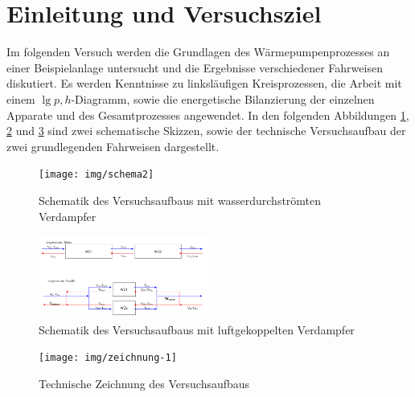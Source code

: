 \section{Einleitung und Versuchsziel}
\label{sec:aufgabenstellung}

Im folgenden Versuch werden die Grundlagen des Wärmepumpenprozesses an einer Beispielanlage untersucht und die Ergebnisse verschiedener Fahrweisen diskutiert. Es werden Kenntnisse zu linksläufigen Kreisprozessen, die Arbeit mit einem $\lg{p}, h$-Diagramm, sowie die energetische Bilanzierung der einzelnen Apparate und des Gesamtprozesses angewendet.
In den folgenden Abbildungen \ref{fig:schema1}, \ref{fig:schema2} und \ref{fig:tech_zeichnung} sind zwei schematische Skizzen, sowie der technische Versuchsaufbau der zwei grundlegenden Fahrweisen dargestellt.

\begin{figure}[h!]
	\centering
	\texttt{[image: img/schema2]}
	\caption{Schematik des Versuchsaufbaus mit wasserdurchströmten Verdampfer}
	\label{fig:schema1}
\end{figure}
\FloatBarrier

\begin{figure}[h!]
	\centering
	\includegraphics[width=0.5\textwidth]{img/schema1}
	\caption{Schematik des Versuchsaufbaus mit luftgekoppelten Verdampfer}
	\label{fig:schema2}
\end{figure}
\FloatBarrier

\begin{figure}[h!]
	\centering
	\texttt{[image: img/zeichnung-1]}
	\caption{Technische Zeichnung des Versuchsaufbaus}
	\label{fig:tech_zeichnung}
\end{figure}
\FloatBarrier


